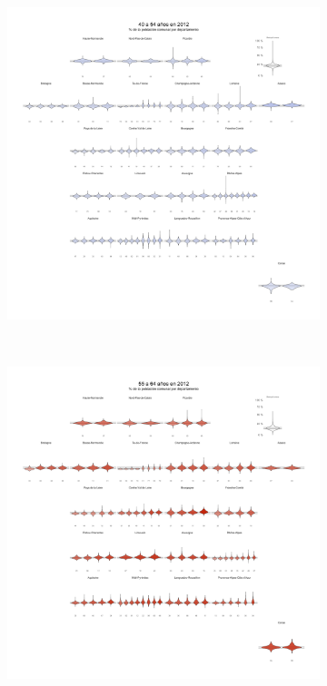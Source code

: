 \begin{figure}[h]
\begin{subfigure}{0.3\textwidth}
	\end{subfigure}
	~
	\begin{subfigure}{0.3\textwidth}
	\includegraphics[width = \textwidth]{Figs/AED/Geofacet_Distr_por_Dpto_Ed4_2012}
	\end{subfigure}
	~
	\begin{subfigure}{0.3\textwidth}
	\includegraphics[width = \textwidth]{Figs/AED/Geofacet_Distr_por_Dpto_Ed5_2012}

\end{subfigure}
\end{figure}
